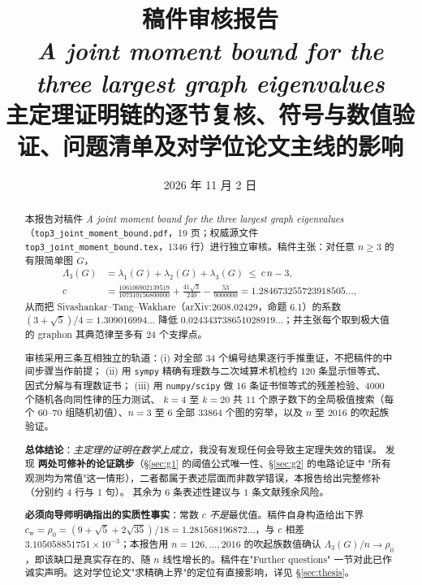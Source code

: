 \documentclass[UTF8,11pt]{ctexart}
\title{\bfseries 稿件审核报告\\[4pt]
\large \emph{A joint moment bound for the three largest graph eigenvalues}\\[2pt]
\normalsize 主定理证明链的逐节复核、符号与数值验证、问题清单及对学位论文主线的影响}
\author{}
\date{2026 年 11 月 2 日}
\theoremstyle{definition}
\newcommand{\Lam}{\Lambda}
\begin{document}
\maketitle
\vspace{-1.5em}

\begin{abstract}
本报告对稿件 \emph{A joint moment bound for the three largest graph eigenvalues}
（\texttt{top3\_joint\_moment\_bound.pdf}，19 页；权威源文件
\texttt{top3\_joint\_moment\_bound.tex}，1346 行）进行独立审核。稿件主张：对任意
$n\ge3$ 的有限简单图 $G$，
\[
\begin{split}
 \Lam_3(G)&=\lambda_1(G)+\lambda_2(G)+\lambda_3(G)\ \le\ c\,n-3,\\
 c&=\frac{106106902139519}{107310156800000}+\frac{41\sqrt3}{240}
    -\frac{53}{9000000}=1.284673255723918505\ldots ,
\end{split}
\]
从而把 Sivashankar--Tang--Wakhare（arXiv:2608.02429，命题 6.1）的系数
$(3+\sqrt5)/4=1.309016994\ldots$ 降低 $0.024343738651028919\ldots$；并主张每个取到极大值的
graphon 其典范律至多有 $24$ 个支撑点。

审核采用三条互相独立的轨道：(i) 对全部 $34$ 个编号结果逐行手推重证，不把稿件的中间步骤当作前提；
(ii) 用 \texttt{sympy} 精确有理数与二次域算术机检约 $120$ 条显示恒等式、因式分解与有理数证书；
(iii) 用 \texttt{numpy/scipy} 做 $16$ 条证书恒等式的残差检验、$4000$ 个随机各向同性律的压力测试、
$k=4$ 至 $k=20$ 共 $11$ 个原子数下的全局极值搜索（每个 $60$--$70$ 组随机初值）、$n=3$ 至 $6$ 全部
$33864$ 个图的穷举，以及 $n$ 至 $2016$ 的吹起族验证。

\textbf{总体结论}：\emph{主定理的证明在数学上成立}，我没有发现任何会导致主定理失效的错误。
发现 \textbf{两处可修补的论证跳步}（\S\ref{sec:g1} 的阈值公式唯一性、\S\ref{sec:g2} 的电路论证中
"所有观测均为常值"这一情形），二者都属于表述层面而非数学错误，本报告给出完整修补（分别约 4 行与 1 句）。
其余为 $6$ 条表述性建议与 $1$ 条文献残余风险。

\textbf{必须向导师明确指出的实质性事实}：常数 $c$ \emph{不是}最优值。稿件自身构造给出下界
$c_{\mathrm w}=\rho_0=(9+\sqrt5+2\sqrt{35})/18=1.281568196872\ldots$，与 $c$ 相差
$3.105058851751\times10^{-3}$；本报告用 $n=126,\ldots,2016$ 的吹起族数值确认
$\Lam_3(G)/n\to\rho_0$，即该缺口是真实存在的、随 $n$ 线性增长的。稿件在"Further questions"
一节对此已作诚实声明。这对学位论文"求精确上界"的定位有直接影响，详见 \S\ref{sec:thesis}。
\end{abstract}

\tableofcontents
\newpage
\end{document}
